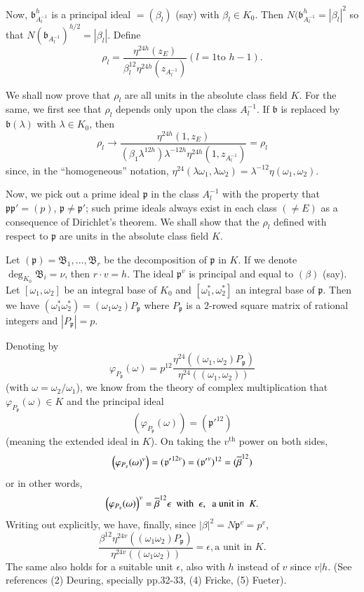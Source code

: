 Now, $\mathfrak{b}^{h}_{A^{-1}_{l}}$ is a principal ideal
$=(\beta_{l})$ (say) with $\beta_{l}\in K_{0}$. Then
$N(\mathfrak{b}^{h}_{A^{-1}_{l}}=|\beta_{l}|^{2}$ so that
  $N(\mathfrak{b}_{A^{-1}_{l}})^{h/2}=|\beta_{l}|$. Define
$$
\rho_{l}=\frac{\eta^{24h}(z_{E})}{\beta^{12}_{l}\eta^{24h}\left(z_{A^{-1}_{l}}\right)}(l=1\text{
  \ to \ } h-1).
$$

We shall now prove that $\rho_{l}$ are all units in the absolute class
field $K$. For the same, we first see that $\rho_{l}$ depends only
upon the class $A^{-1}_{l}$. If $\mathfrak{b}$ is replaced by
$\mathfrak{b}(\lambda)$ with $\lambda\in K_{0}$, then
$$
\rho_{l}\to 
\frac{\eta^{24h}(1,z_{E})}{(\beta_{1}\lambda^{12h})\lambda^{-12h}\eta^{24h}\left(1,z_{A^{-1}_{l}}\right)}=\rho_{l}  
$$
since, in the ``homogeneous'' notation,
$\eta^{24}(\lambda\omega_{1},\lambda\omega_{2})=\lambda^{-12}\eta(\omega_{1},\omega_{2})$. 

Now, we pick out a prime ideal $\mathfrak{p}$ in the class
$A^{-1}_{l}$ with the property that $\mathfrak{p}\mathfrak{p}'=(p)$,
$\mathfrak{p}\neq \mathfrak{p}'$; such prime ideals always exist in
each class $(\neq E)$ as a consequence of Dirichlet's theorem. We
shall show that the $\rho_{l}$ defined with respect to $\mathfrak{p}$
are units in the absolute class field $K$.

Let $(\mathfrak{p})=\mathfrak{B}_{1},\ldots,\mathfrak{B}_{r}$ be the
decomposition of $\mathfrak{p}$ in $K$. If we denote
$\deg_{K_{0}}\mathfrak{B}_{i}=\nu$, then $r\cdot v=h$. The ideal
$\mathfrak{p}^{v}$ is principal and equal to $(\beta)$ (say). Let
$[\omega_{1},\omega_{2}]$ be an integral base of $K_{0}$ and
$[\omega^{\ast}_{1},\omega^{\ast}_{2}]$ an integral base of
$\mathfrak{p}$. Then we have
$(\omega^{\ast}_{1}\omega^{\ast}_{2})=(\omega_{1}\omega_{2}) P_{\mathfrak{p}}$
where $P_{\mathfrak{p}}$ is a $2$-rowed square matrix of rational integers and
$|P_{\mathfrak{p}}|=p$. 

Denoting by
$$
\varphi_{P_{\mathfrak{p}}}(\omega)=p^{12}\frac{\eta^{24}((\omega_{1},\omega_{2})P_{\mathfrak{p}})}{\eta^{24}((\omega_{1},\omega_{2}))} 
$$
(with $\omega=\omega_{2}/\omega_{1}$), we know from the theory of
complex multiplication that\pageoriginale $\varphi_{P_{\mathfrak{p}}}(\omega)\in K$
and the principal ideal
$$
\left(\varphi_{P_{\mathfrak{p}}}(\omega)\right)=({\mathfrak{p}'}^{12})
$$
(meaning the extended ideal in $K$). On taking the $v^{\text{th}}$
power on both sides, 
$$
\left(\varphi_{P_{\mathfrak{p}}}(\omega)^{v}\right)=({\mathfrak{p}'}^{12v})=({\mathfrak{p}'}^{v})^{12}=(\overline{\beta}^{12}) 
$$
or in other words,
$$
\left(\varphi_{P_{\mathfrak{p}}}(\omega)\right)^{v}=\overline{\beta}^{12}\epsilon\text{
  \  with \ }\epsilon, \text{ \ a unit in \ } K.
$$
Writing out explicitly, we have, finally, since
$|\beta|^{2}=N\mathfrak{p}^{v}=p^{v}$, 
$$
\frac{\beta^{12}\eta^{24v}((\omega_{1}\omega_{2})P_{\mathfrak{p}})}{\eta^{24v}((\omega_{1}\omega_{2}))}=\epsilon,\text{
  \ a unit in } K.
$$
The same also holds for a suitable unit $\epsilon$, also with $h$
instead of $v$ since $v|h$. (See references (2) Deuring,
specially pp.\@ 32-33, (4) Fricke, (5) Fueter).

